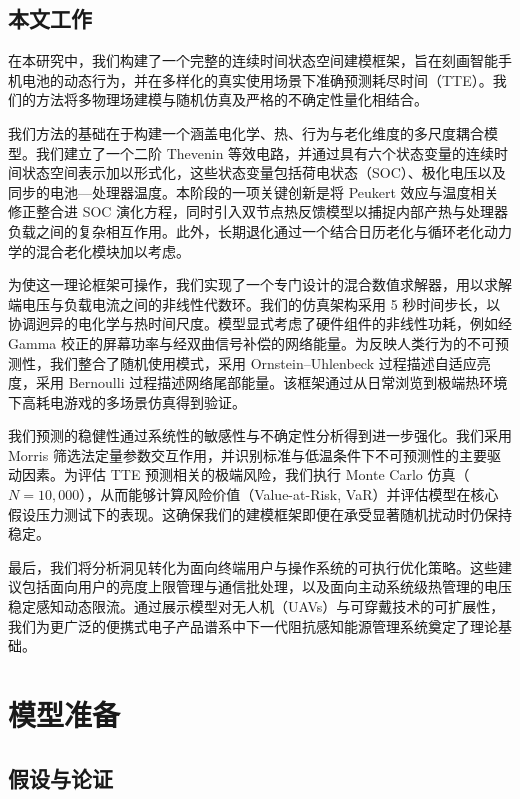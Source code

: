 \documentclass[11pt,a4paper]{ctexart}
\begin{document}
\subsection{本文工作}

在本研究中，我们构建了一个完整的连续时间状态空间建模框架，旨在刻画智能手机电池的动态行为，并在多样化的真实使用场景下准确预测耗尽时间（TTE）。我们的方法将多物理场建模与随机仿真及严格的不确定性量化相结合。

我们方法的基础在于构建一个涵盖电化学、热、行为与老化维度的多尺度耦合模型。我们建立了一个二阶 Thevenin 等效电路，并通过具有六个状态变量的连续时间状态空间表示加以形式化，这些状态变量包括荷电状态（SOC）、极化电压以及同步的电池—处理器温度。本阶段的一项关键创新是将 Peukert 效应与温度相关修正整合进 SOC 演化方程，同时引入双节点热反馈模型以捕捉内部产热与处理器负载之间的复杂相互作用。此外，长期退化通过一个结合日历老化与循环老化动力学的混合老化模块加以考虑。

为使这一理论框架可操作，我们实现了一个专门设计的混合数值求解器，用以求解端电压与负载电流之间的非线性代数环。我们的仿真架构采用 5 秒时间步长，以协调迥异的电化学与热时间尺度。模型显式考虑了硬件组件的非线性功耗，例如经 Gamma 校正的屏幕功率与经双曲信号补偿的网络能量。为反映人类行为的不可预测性，我们整合了随机使用模式，采用 Ornstein--Uhlenbeck 过程描述自适应亮度，采用 Bernoulli 过程描述网络尾部能量。该框架通过从日常浏览到极端热环境下高耗电游戏的多场景仿真得到验证。

我们预测的稳健性通过系统性的敏感性与不确定性分析得到进一步强化。我们采用 Morris 筛选法定量参数交互作用，并识别标准与低温条件下不可预测性的主要驱动因素。为评估 TTE 预测相关的极端风险，我们执行 Monte Carlo 仿真（$N=10{,}000$），从而能够计算风险价值（Value-at-Risk, VaR）并评估模型在核心假设压力测试下的表现。这确保我们的建模框架即便在承受显著随机扰动时仍保持稳定。

最后，我们将分析洞见转化为面向终端用户与操作系统的可执行优化策略。这些建议包括面向用户的亮度上限管理与通信批处理，以及面向主动系统级热管理的电压稳定感知动态限流。通过展示模型对无人机（UAVs）与可穿戴技术的可扩展性，我们为更广泛的便携式电子产品谱系中下一代阻抗感知能源管理系统奠定了理论基础。

\section{模型准备}

\subsection{假设与论证}
\end{document}
